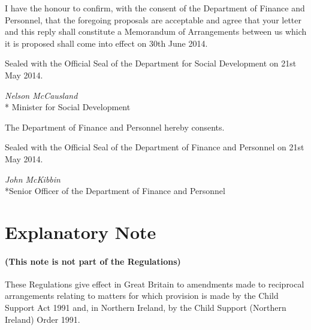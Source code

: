 \documentclass[12pt,a4paper]{article}
\begin{document}
I have the honour to confirm, with the consent of the Department of Finance and
Personnel, that the foregoing proposals are acceptable and agree that your letter and this
reply shall constitute a Memorandum of Arrangements between us which it is proposed
shall come into effect on 30th June 2014.

\bigskip

\pagebreak[3]

Sealed with the Official Seal of the Department for Social Development on 21st May 2014.

{\raggedleft
\emph{Nelson McCausland}\\*
Minister for Social Development

}

\bigskip

\pagebreak[3]

The Department of Finance and Personnel hereby consents.

Sealed with the Official Seal of the Department of Finance and Personnel on 21st May 2014.

{\raggedleft
\emph{John McKibbin}\\*Senior Officer of the Department of Finance and Personnel

}

\part{Explanatory Note}

\renewcommand\parthead{— Explanatory Note}

\subsection*{(This note is not part of the Regulations)}

These Regulations give effect in Great Britain to amendments made to reciprocal arrangements relating to matters for which provision is made by the Child Support Act 1991 and, in Northern Ireland, by the Child Support (Northern Ireland) Order 1991.
\end{document}
